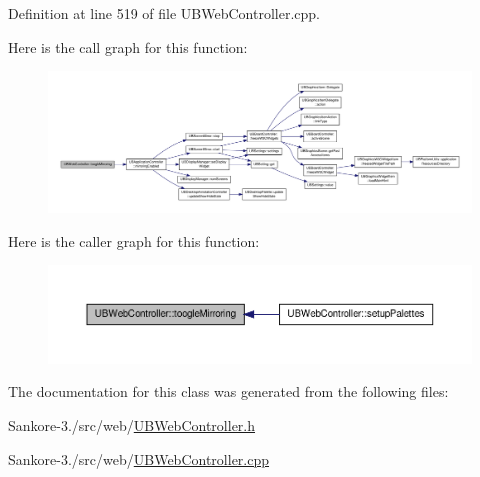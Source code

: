 Definition at line 519 of file U\-B\-Web\-Controller.\-cpp.



Here is the call graph for this function\-:
\nopagebreak
\begin{figure}[H]
\begin{center}
\leavevmode
\includegraphics[width=350pt]{df/d50/class_u_b_web_controller_a3bd0afac31c8ed2a086d486b0bfccaae_cgraph}
\end{center}
\end{figure}




Here is the caller graph for this function\-:
\nopagebreak
\begin{figure}[H]
\begin{center}
\leavevmode
\includegraphics[width=350pt]{df/d50/class_u_b_web_controller_a3bd0afac31c8ed2a086d486b0bfccaae_icgraph}
\end{center}
\end{figure}




The documentation for this class was generated from the following files\-:\begin{DoxyCompactItemize}
\item 
Sankore-\/3./src/web/\hyperlink{_u_b_web_controller_8h}{U\-B\-Web\-Controller.\-h}\item 
Sankore-\/3./src/web/\hyperlink{_u_b_web_controller_8cpp}{U\-B\-Web\-Controller.\-cpp}\end{DoxyCompactItemize}
